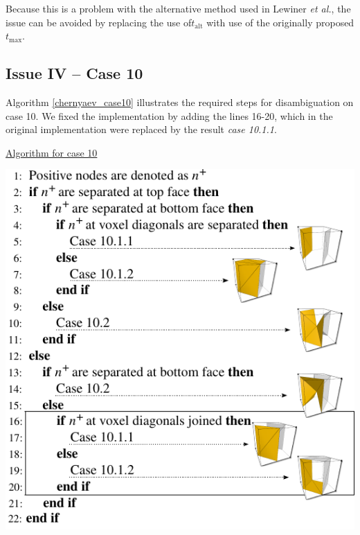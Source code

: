 Because this is a problem with the alternative method used in Lewiner \emph{et al.}, the issue can be avoided by replacing the use of$t_{\mathrm{alt}}$ with use of the originally proposed $t_{\mathrm{max}}$.

\subsection{Issue IV -- Case 10}

Algorithm \ref{chernyaev_case10} illustrates the required steps for disambiguation on case 10. We fixed the \mc{} implementation by adding the lines 16-20, which in the original implementation were replaced by the result \textit{case 10.1.1}. 



\begin{algorithm}
\caption{\href{http://dl.dropbox.com/u/8414964/C-MC33/webpage/alg2.html}{Algorithm for case 10}}
\label{chernyaev_case10}
\includegraphics[width=0.95\linewidth]{chapter4/figures/algorithm.pdf}
\end{algorithm}



